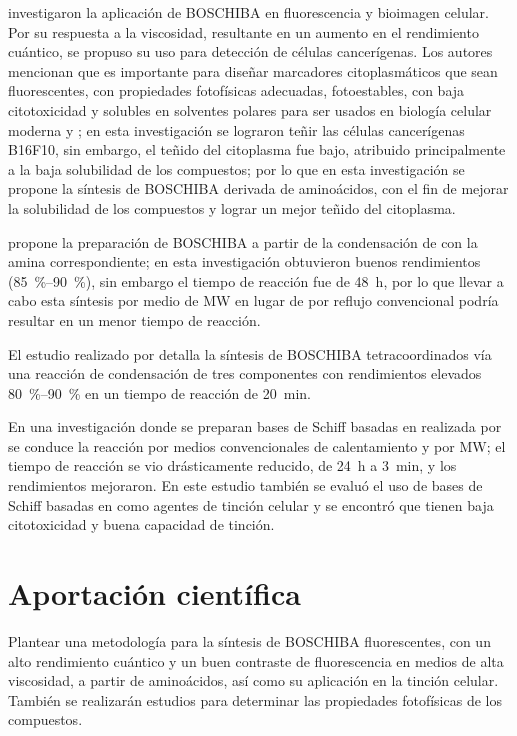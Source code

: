 \documentclass[12pt,spanish]{scrartcl}
\begin{document}
\textcite{ibarra-rodriguezOrganoboronSchiffBases2019} investigaron la aplicación de \gls{BOSCHIBA} en fluorescencia y bioimagen celular. Por su respuesta a la viscosidad, resultante en un aumento en el rendimiento cuántico, se propuso su uso para detección de células cancerígenas. Los autores mencionan que es importante para diseñar marcadores citoplasmáticos que sean fluorescentes, con propiedades fotofísicas adecuadas, fotoestables, con baja citotoxicidad y solubles en solventes polares para ser usados en biología celular moderna \invitro{} y \invivo{}; en esta investigación se lograron teñir las células cancerígenas B16F10, sin embargo, el teñido del citoplasma fue bajo, atribuido principalmente a la baja solubilidad de los compuestos; por lo que en esta investigación se propone la síntesis de \gls{BOSCHIBA} derivada de aminoácidos, con el fin de mejorar la solubilidad de los compuestos y lograr un mejor teñido del citoplasma.

\textcite{corona-lopezFarRedInfrared2021} propone la preparación de \gls{BOSCHIBA} a partir de la condensación de  con la amina correspondiente; en esta investigación obtuvieron buenos rendimientos  (\qtyrange{85}{90}{\percent}), sin embargo el tiempo de reacción fue de \qty{48}{\hour}, por lo que llevar a cabo esta síntesis por medio de \gls{MW} en lugar de por reflujo convencional podría resultar en un menor tiempo de reacción.

El estudio realizado por \textcite{garcia-lopezNewLuminescentOrganoboron2022} detalla la síntesis de \gls{BOSCHIBA} tetracoordinados vía una reacción de condensación de tres componentes con rendimientos elevados \qtyrange{80}{90}{\percent} en un tiempo de reacción de \qty{20}{\minute}.

En una investigación donde se preparan bases de Schiff basadas en  realizada por \textcite{lopez-espejelOrganotinSchiffBases2021} se conduce la reacción por medios convencionales de calentamiento y por \gls{MW}; el tiempo de reacción se vio drásticamente reducido, de \qty{24}{\hour} a \qty{3}{\minute}, y los rendimientos mejoraron. En este estudio también se evaluó el uso de bases de Schiff basadas en  como agentes de tinción celular y se encontró que tienen baja citotoxicidad y buena capacidad de tinción.

\section{Aportación científica}
Plantear una metodología para la síntesis de \gls{BOSCHIBA} fluorescentes, con un alto rendimiento cuántico y un buen contraste de fluorescencia en medios de alta viscosidad, a partir de aminoácidos, así como su aplicación en la tinción celular. También se realizarán estudios \insilico{} para determinar las propiedades fotofísicas de los compuestos.
\end{document}
